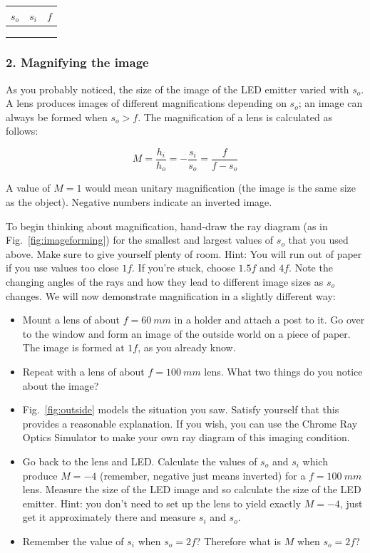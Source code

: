 \documentclass[a4paper]{report}
\begin{document}
\vspace{2em}
\begin{tabular}{| p{1cm} | p{1cm} | p{1cm} |}
\hline
 $s_o$  &  $s_i$  &  $f$  \\
\hline
\hline
 & & \\ \hline
 & & \\ \hline
 & & \\ \hline
\end{tabular}


\subsubsection{2. Magnifying the image}
As you probably noticed, the size of the image of the LED emitter varied with $s_o$.
A lens produces images of different magnifications depending on $s_o$; an image can always be formed when $s_o>f$. 
The magnification of a lens is calculated as follows:

\begin{equation}
M = \frac{h_i}{h_o} = -\frac{s_i}{s_o} = \frac{f}{f-s_o}
\label{eq:mag}
\end{equation}

A value of $M=1$ would mean unitary magnification (the image is the same size as the object). 
Negative numbers indicate an inverted image.

To begin thinking about magnification, hand-draw the ray diagram (as in Fig.~\ref{fig:imageforming}) for the smallest and largest values of $s_o$ that you used above. 
Make sure to give yourself plenty of room. 
Hint: You will run out of paper if you use values too close $1f$.
If you're stuck, choose $1.5f$ and $4f$.
Note the changing angles of the rays and how they lead to different image sizes as $s_o$ changes. 
We will now demonstrate magnification in a slightly different way:

\begin{itemize}
\item Mount a lens of about $f=60~mm$ in a holder and attach a post to it. 
Go over to the window and form an image of the outside world on a piece of paper. 
The image is formed at $1f$, as you already know. 
\item Repeat with a lens of about $f=100~mm$ lens. 
What two things do you notice about the image? 
\item Fig.~\ref{fig:outside} models the situation you saw. Satisfy yourself that this provides a reasonable explanation. 
If you wish, you can use the Chrome Ray Optics Simulator to make your own ray diagram of this imaging condition. 
\item Go back to the lens and LED.
Calculate the values of $s_o$ and $s_i$ which produce $M=-4$ (remember, negative just means inverted) for a $f=100~mm$ lens. 
Measure the size of the LED image and so calculate the size of the LED emitter. 
Hint: you don't need to set up the lens to yield exactly $M=-4$, just get it approximately there and measure $s_i$ and $s_o$.
\item Remember the value of $s_i$ when $s_o=2f$? Therefore what is $M$ when $s_o=2f$?
\end{itemize}
\end{document}
